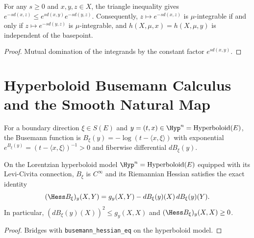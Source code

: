 \begin{theorem}
\label{thm_critical_exponent_invariance}
\leanok
{}
For any $s \ge 0$ and $x, y, z \in X$, the triangle inequality gives $e^{-s d(x,z)} \le e^{s d(x,y)} e^{-s d(y,z)}$. Consequently, $z \mapsto e^{-s d(x,z)}$ is $\mu$-integrable if and only if $z \mapsto e^{-s d(y,z)}$ is $\mu$-integrable, and $h(X, \mu, x) = h(X, \mu, y)$ is independent of the basepoint.
\end{theorem}
\begin{proof}\leanok Mutual domination of the integrands by the constant factor $e^{s d(x,y)}$.\end{proof}

\chapter{Hyperboloid Busemann Calculus and the Smooth Natural Map}

\begin{definition}
\label{def_hyperboloid_busemann}
\leanok
For a boundary direction $\xi \in S(E)$ and $y = (t, x) \in \Hyp^n = \mathrm{Hyperboloid}(E)$, the Busemann function is $B_\xi(y) = -\log(t - \langle x, \xi\rangle)$ with exponential $e^{B_\xi(y)} = (t - \langle x, \xi\rangle)^{-1} > 0$ and fiberwise differential $dB_\xi(y)$.
\end{definition}

\begin{theorem}
\label{thm_hyperboloid_busemann_hessian}
\leanok
{}
On the Lorentzian hyperboloid model $\Hyp^n = \mathrm{Hyperboloid}(E)$ equipped with its Levi-Civita connection, $B_\xi$ is $C^\infty$ and its Riemannian Hessian satisfies the exact identity
$$(\Hess B_\xi)_y(X, Y) = g_y(X, Y) - dB_\xi(y)(X)\,dB_\xi(y)(Y).$$
In particular, $(dB_\xi(y)(X))^2 \le g_y(X, X)$ and $(\Hess B_\xi)_y(X, X) \ge 0$.
\end{theorem}
\begin{proof}\leanok Bridges with \texttt{busemann\_hessian\_eq} on the hyperboloid model.\end{proof}

